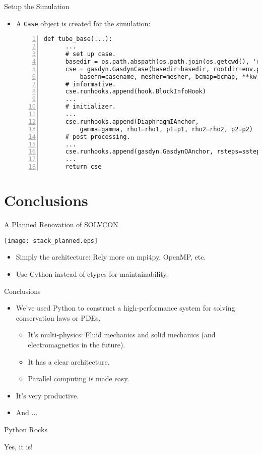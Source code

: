 \documentclass[dvips,xcolor=pst,14pt]{beamer}
\begin{document}
\begin{frame}[fragile]{
%
Setup the Simulation
%
}
\begin{itemize} \small
  \item A \texttt{Case} object is created for the simulation:
  \begin{Verbatim}[frame=single,numbers=left,fontsize=\scriptsize]
  def tube_base(...):
      ...
      # set up case.
      basedir = os.path.abspath(os.path.join(os.getcwd(), 'result'))
      cse = gasdyn.GasdynCase(basedir=basedir, rootdir=env.projdir,
          basefn=casename, mesher=mesher, bcmap=bcmap, **kw)
      # informative.
      cse.runhooks.append(hook.BlockInfoHook)
      ...
      # initializer.
      ...
      cse.runhooks.append(DiaphragmIAnchor,
          gamma=gamma, rho1=rho1, p1=p1, rho2=rho2, p2=p2)
      # post processing.
      ...
      cse.runhooks.append(gasdyn.GasdynOAnchor, rsteps=ssteps)
      ...
      return cse
  \end{Verbatim}
\end{itemize}
\end{frame}

\section{
Conclusions
}

\begin{frame}{
%
A Planned Renovation of SOLVCON
%
}
\begin{center}
  \parbox{\textwidth}{\centering
  \texttt{[image: stack\_planned.eps]}}
\end{center}
\begin{itemize} \footnotesize
  \item Simply the architecture: Rely more on mpi4py, OpenMP, etc.
  \item Use Cython instead of ctypes for maintainability.
\end{itemize}
\end{frame}

\begin{frame}{
%
Conclusions
%
}
\begin{itemize}
  \item We've used Python to construct a high-performance system for solving
  conservation laws or PDEs.
  \begin{itemize} \normalsize
    \item It's multi-physics: Fluid mechanics and solid mechanics (and
    electromagnetics in the future).
    \item It has a clear architecture.
    \item Parallel computing is made easy.
  \end{itemize}
  \item It's very \alert{productive}.
  \item And ...
\end{itemize}
\end{frame}

\begin{frame}{
%
Python Rocks
%
}
\begin{center} \Huge
  Yes, it is!
\end{center}
\end{frame}
\end{document}

